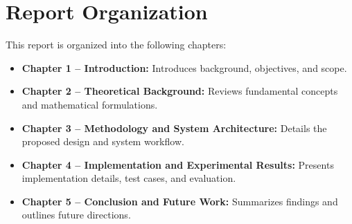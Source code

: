\section{Report Organization}
\label{sec:organization}

This report is organized into the following chapters:
\begin{itemize}
    \item \textbf{Chapter 1 -- Introduction:} Introduces background, objectives, and scope.
    \item \textbf{Chapter 2 -- Theoretical Background:} Reviews fundamental concepts and mathematical formulations.
    \item \textbf{Chapter 3 -- Methodology and System Architecture:} Details the proposed design and system workflow.
    \item \textbf{Chapter 4 -- Implementation and Experimental Results:} Presents implementation details, test cases, and evaluation.
    \item \textbf{Chapter 5 -- Conclusion and Future Work:} Summarizes findings and outlines future directions.
\end{itemize}

